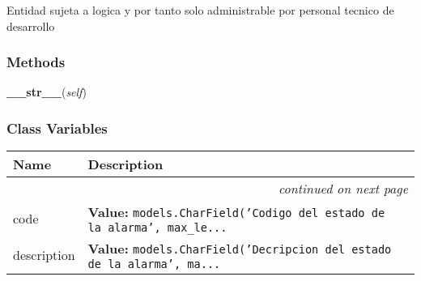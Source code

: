 Entidad sujeta a logica y por tanto solo administrable por personal tecnico
de desarrollo



  \subsubsection{Methods}

    \label{GroundSegment:models:Alarm:AlarmState:AlarmState:__str__}

    \vspace{0.5ex}

\hspace{.8\funcindent}\begin{boxedminipage}{\funcwidth}

    \raggedright \textbf{\_\_str\_\_}(\textit{self})

\setlength{\parskip}{2ex}
\setlength{\parskip}{1ex}
    \end{boxedminipage}



  \subsubsection{Class Variables}

    \vspace{-1cm}
\hspace{\varindent}\begin{longtable}{|p{\varnamewidth}|p{\vardescrwidth}|l}
\cline{1-2}
\cline{1-2} \centering \textbf{Name} & \centering \textbf{Description}& \\
\cline{1-2}
\endhead\cline{1-2}\multicolumn{3}{r}{\small\textit{continued on next page}}\\\endfoot\cline{1-2}
\endlastfoot\raggedright c\-o\-d\-e\- & \raggedright \textbf{Value:} 
{\tt models.CharField('Codigo del estado de la alarma', max\_le\texttt{...}}&\\
\cline{1-2}
\raggedright d\-e\-s\-c\-r\-i\-p\-t\-i\-o\-n\- & \raggedright \textbf{Value:} 
{\tt models.CharField('Decripcion del estado de la alarma', ma\texttt{...}}&\\
\cline{1-2}
\end{longtable}

